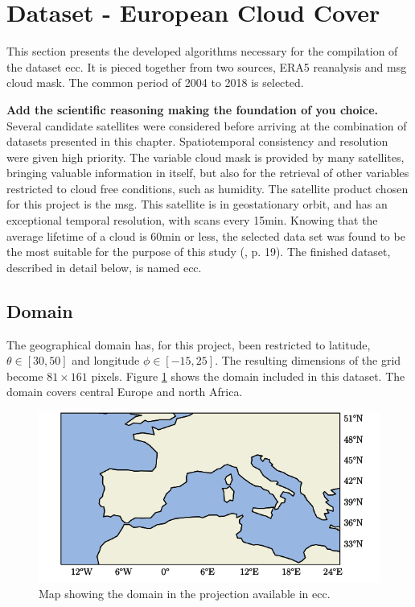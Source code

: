 \section{Dataset - European Cloud Cover }
This section presents the developed algorithms necessary for the compilation of the dataset \acrfull{ecc}. It is pieced together from two sources, ERA5 reanalysis and \acrlong{msg} cloud mask. The common period of 2004 to 2018 is selected.

\textbf{Add the scientific reasoning making the foundation of you choice.}
Several candidate satellites were considered before arriving at the combination of datasets presented in this chapter. Spatiotemporal consistency and resolution were given high priority. The variable cloud mask is provided by many satellites, bringing valuable information in itself, but also for the retrieval of other variables restricted to cloud free conditions, such as humidity. The satellite product chosen for this project is the \acrfull{msg}. This satellite is in geostationary orbit, and has an exceptional temporal resolution, with scans every 15min. Knowing that the average lifetime of a cloud is 60min or less, the selected data set was found to be the most suitable for the purpose of this study (\cite{lohmann2016}, p. 19). The finished dataset, described in detail below, is named \acrfull{ecc}. 

\subsection{Domain}
The geographical domain has, for this project, been restricted to latitude, $\theta \in[30,50]$ and longitude $\phi \in [-15, 25]$. The resulting dimensions of the grid become $81\times161$ pixels. Figure \ref{fig:map} shows the domain included in this dataset. The domain covers central Europe and north Africa.
\begin{figure}[h]
    \centering
    \includegraphics[scale = 1.0]{python_figs/Domain.png}
    \caption[Map over domain.]{Map showing the domain in the projection available in \acrshort{ecc}.}
    \label{fig:map}
\end{figure}

